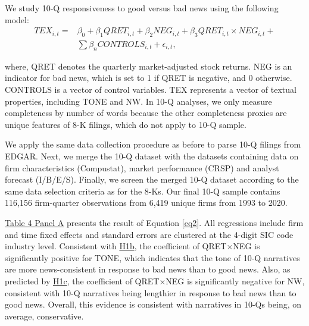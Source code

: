 \documentclass[letterpaper,12pt]{article}
\begin{document}
\begin{spacing}{1.5}
We study 10-Q responsiveness to good versus bad news using the following model: 
\begin{equation}
	\begin{aligned} 
		\label{eq2}
		TEX_{i,t}=
		&\beta_0+\beta_1QRET_{i,t}+\beta_2NEG_{i,t}+\beta_3QRET_{i,t}\times NEG_{i,t}+\\
		&\sum\beta_nCONTROLS_{i,t}+\epsilon_{i,t},
	\end{aligned} 
\end{equation}

\noindent where, QRET denotes the quarterly market-adjusted stock returns. NEG is an indicator for bad news, which is set to 1 if QRET is negative, and 0 otherwise. CONTROLS is a vector of control variables. TEX represents a vector of textual properties, including TONE and NW. In 10-Q analyses, we only measure completeness by number of words because the other completeness proxies are unique features of 8-K filings, which do not apply to 10-Q sample.  

We apply the same data collection procedure as before to parse 10-Q filings from EDGAR. Next, we merge the 10-Q dataset with the datasets containing data on firm characteristics (Compustat), market performance (CRSP) and analyst forecast (I/B/E/S). Finally, we screen the merged 10-Q dataset according to the same data selection criteria as for the 8-Ks. Our final 10-Q sample contains 116,156 firm-quarter observations from 6,419 unique firms from 1993 to 2020.

\hyperref[T4PA]{Table 4 Panel A} presents the result of Equation \eqref{eq2}. All regressions include firm and time fixed effects and standard errors are clustered at the 4-digit SIC code industry level. Consistent with \hyperref[hyp:h1b]{H1b}, the coefficient of QRET$\times$NEG is significantly positive for TONE, which indicates that the tone of 10-Q narratives are more news-consistent in response to bad news than to good news. Also, as predicted by \hyperref[hyp:h1c]{H1c}, the coefficient of QRET$\times$NEG is significantly negative for NW, consistent with 10-Q narratives being lengthier in response to bad news than to good news. Overall, this evidence is consistent with narratives in 10-Qs being, on average, conservative.


\end{spacing}
\end{document}

